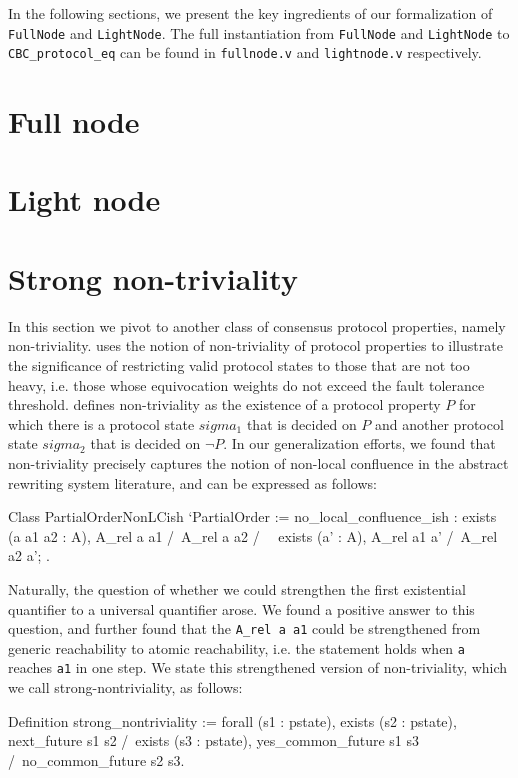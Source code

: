 \documentclass[runningheads]{llncs}
\begin{document}
In the following sections, we present the key ingredients of our formalization of \verb|FullNode| and \verb|LightNode|. The full instantiation from \verb|FullNode| and \verb|LightNode| to \verb|CBC_protocol_eq| can be found in \verb|fullnode.v| and \verb|lightnode.v| respectively.

\section{Full node}
\label{sec:full}


\section{Light node}
\label{sec:light}


\section{Strong non-triviality}
In this section we pivot to another class of consensus protocol properties, namely non-triviality. \cite{CBClight} uses the notion of non-triviality of protocol properties to illustrate the significance of restricting valid protocol states to those that are not too heavy, i.e. those whose equivocation weights do not exceed the fault tolerance threshold. \cite{CBClight} defines non-triviality as the existence of a protocol property $P$ for which there is a protocol state $sigma_1$ that is decided on $P$ and another protocol state $sigma_2$ that is decided on $\neg P$.
In our generalization efforts, we found that non-triviality precisely captures the notion of non-local confluence in the abstract rewriting system literature, and can be expressed as follows:
\begin{coq}
Class PartialOrderNonLCish `{PartialOrder} :=
	{ no_local_confluence_ish : exists (a a1 a2 : A),
		A_rel a a1 /\ A_rel a a2 /\
		~ exists (a' : A), A_rel a1 a' /\ A_rel a2 a';
	}.
\end{coq}
Naturally, the question of whether we could strengthen the first existential quantifier to a universal quantifier arose. We found a positive answer to this question, and further found that the \verb|A_rel a a1| could be strengthened from generic reachability to atomic reachability, i.e. the statement holds when \verb|a| reaches \verb|a1| in one step. We state this strengthened version of non-triviality, which we call strong-nontriviality, as follows:
\begin{coq}
Definition strong_nontriviality :=
	forall (s1 : pstate),
	exists (s2 : pstate),
	next_future s1 s2 /\
	exists (s3 : pstate),
	yes_common_future s1 s3
	/\
	no_common_future s2 s3.
\end{coq}
\end{document}
